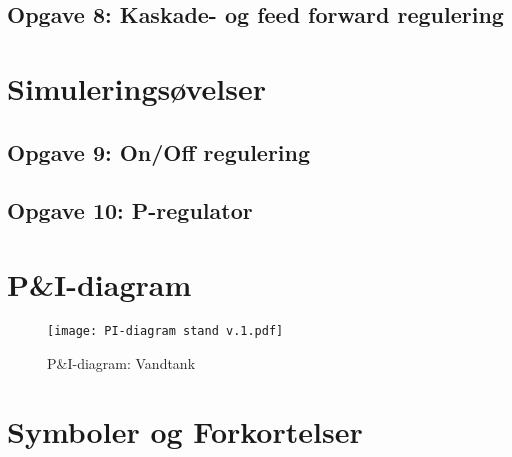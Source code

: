 \documentclass[12pt,a4paper]{article}
\begin{document}
	\subsection{Opgave 8: Kaskade- og feed forward	regulering}
	\label{subsec:Opgave8}
	
	\clearpage
	\section{Simuleringsøvelser}
	\subsection{Opgave 9: On/Off regulering}
	\label{subsec:Opgave1S}
	
	\subsection{Opgave 10: P-regulator}
	\label{subsec:Opgave2S}
	
%	
%	
%	
	\clearpage
	\section{P\&I-diagram}
	\label{sec:PIdiagram}
	\begin{figure}[h!]
		\centering
		\texttt{[image: PI-diagram stand v.1.pdf]}
		\caption{P\&I-diagram: Vandtank}
		\label{fig:Pidiagram}
	\end{figure}
	\section*{Symboler og Forkortelser}
	
\end{document}
